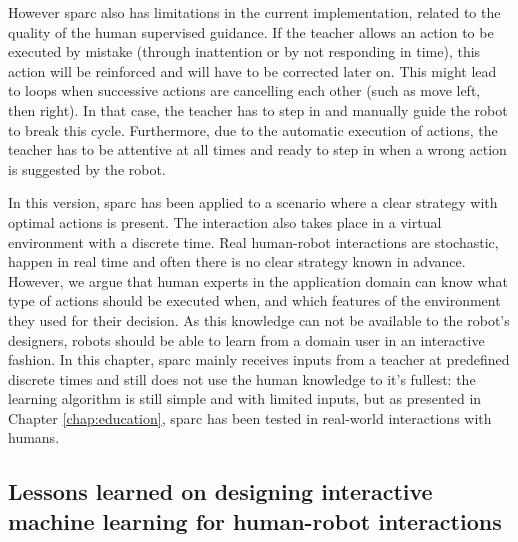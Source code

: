 However \gls{sparc} also has limitations in the current implementation, related to the quality of the human supervised guidance. If the teacher allows an action to be executed by mistake (through inattention or by not responding in time), this action will be reinforced and will have to be corrected later on. This might lead to loops when successive actions are cancelling each other (such as move left, then right). In that case, the teacher has to step in and manually guide the robot to break this cycle. Furthermore, due to the automatic execution of actions, the teacher has to be attentive at all times and ready to step in when a wrong action is suggested by the robot.

In this version, \gls{sparc} has been applied to a scenario where a clear strategy with optimal actions is present. The interaction also takes place in a virtual environment with a discrete time. Real human-robot interactions are stochastic, happen in real time and often there is no clear strategy known in advance. However, we argue that human experts in the application domain can know what type of actions should be executed when, and which features of the environment they used for their decision. As this knowledge can not be available to the robot's designers, robots should be able to learn from a domain user in an interactive fashion. In this chapter, \gls{sparc} mainly receives inputs from a teacher at predefined discrete times and still does not use the human knowledge to it's fullest: the learning algorithm is still simple and with limited inputs, but as presented in Chapter \ref{chap:education},  \gls{sparc} has been tested in real-world interactions with humans.


\subsection{Lessons learned on designing interactive machine learning for human-robot interactions}

